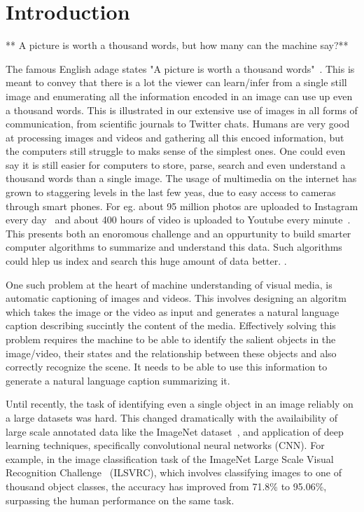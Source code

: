 \chapter{Introduction}
\label{chapter:intro}
** A picture is worth a thousand words, but how many can the machine say?**

The famous English adage states "A picture is worth a thousand
words"~\cite{ThousandQuote}. This is meant to convey that there is a lot the
viewer can learn/infer from a single still image and enumerating all the
information encoded in an image can use up even a thousand words. This is
illustrated in our extensive use of images in all forms of communication, from
scientific journals to Twitter chats. 
%
Humans are very good at processing images and videos and gathering all this
encoed information, but the computers still struggle to maks sense of the
simplest ones.
%
One could even say it is still easier for computers to store, parse, search and
even understand a thousand words than a single image.
%
The usage of multimedia on the internet has grown to staggering levels in the
last few yeas, due to easy access to cameras through smart phones. For eg. about
95 million photos are uploaded to Instagram every day~\cite{InstStats} and about
400 hours of video is uploaded to Youtube every minute~\cite{YouStats}. This
presents both an enoromous challenge and an oppurtunity to build smarter
computer algorithms to summarize and understand this data. Such algorithms could
hlep us index and search this huge amount of data better. .
%

One such problem at the heart of machine understanding of visual media, is
automatic captioning of images and videos. This involves designing an algoritm
which takes the image or the video as input and generates a natural language
caption describing succintly the content of the media. Effectively solving this
problem requires the machine to be able to identify the salient objects in the
image/video, their states and the relationship between these objects and also
correctly recognize the scene. It needs to be able to use this information to
generate a natural language caption summarizing it.

Until recently, the task of identifying even a single object in an image
reliably on a large datasets was hard. This changed dramatically with the
availaibility of large scale annotated data like the ImageNet
dataset~\cite{ImagenetOrig}, and  application of deep learning techniques,
specifically convolutional neural networks (CNN). For example, in the image
classification task of the ImageNet Large Scale Visual Recognition
Challenge~\cite{ILSVRC15} (ILSVRC), which involves classifying images to one of
thousand object classes, the accuracy has improved from 71.8\% to 95.06\%,
surpassing the human performance on the same task. 

